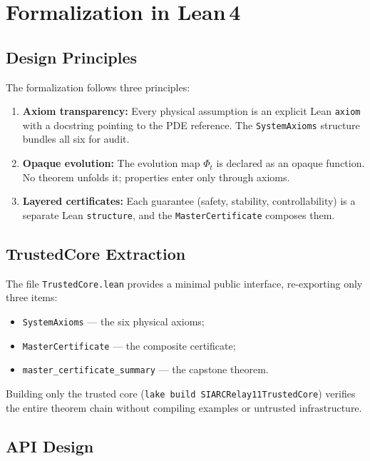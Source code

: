 \documentclass[11pt,a4paper]{article}
\theoremstyle{plain}
\theoremstyle{definition}
\theoremstyle{remark}
\newcommand{\leaninline}[1]{\texttt{#1}}
\begin{document}
\section{Formalization in Lean\,4}\label{sec:lean}

\subsection{Design Principles}

The formalization follows three principles:

\begin{enumerate}
  \item \textbf{Axiom transparency:} Every physical assumption is an
    explicit Lean \texttt{axiom} with a docstring pointing to the PDE
    reference.  The \leaninline{SystemAxioms} structure bundles all six
    for audit.
  \item \textbf{Opaque evolution:} The evolution map $\Phi_t$ is declared
    as an opaque function.  No theorem unfolds it; properties enter only
    through axioms.
  \item \textbf{Layered certificates:} Each guarantee (safety, stability,
    controllability) is a separate Lean \texttt{structure}, and the
    \leaninline{MasterCertificate} composes them.
\end{enumerate}

\subsection{TrustedCore Extraction}

The file \leaninline{TrustedCore.lean} provides a minimal public
interface, re-exporting only three items:
\begin{itemize}
  \item \leaninline{SystemAxioms} --- the six physical axioms;
  \item \leaninline{MasterCertificate} --- the composite certificate;
  \item \leaninline{master\_certificate\_summary} --- the capstone theorem.
\end{itemize}

Building only the trusted core (\texttt{lake build SIARCRelay11TrustedCore})
verifies the entire theorem chain without compiling examples or untrusted
infrastructure.

\subsection{API Design}
\end{document}
